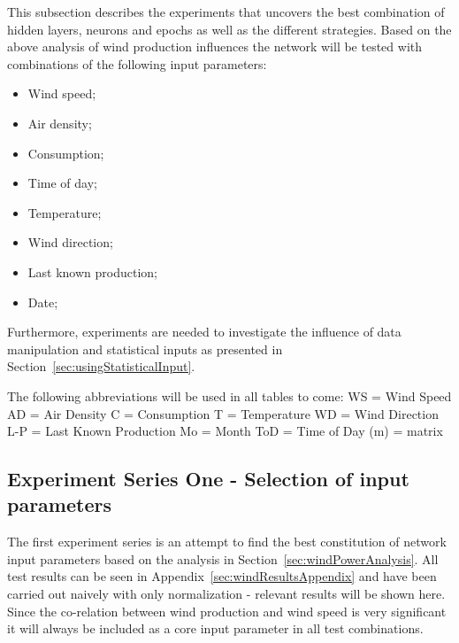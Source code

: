 This subsection describes the experiments that uncovers the best combination of hidden layers, neurons and epochs as well as the different strategies. Based on the above analysis of wind production influences the network will be tested with combinations of the following input parameters:

\begin{itemize}
\item Wind speed;
\item Air density;
\item Consumption;
\item Time of day;
\item Temperature;
\item Wind direction;
\item Last known production;
\item Date;
\end{itemize}

Furthermore, experiments are needed to investigate the influence of data manipulation and statistical inputs as presented in Section~\ref{sec:usingStatisticalInput}. 

The following abbreviations will be used in all tables to come:
WS = Wind Speed
AD = Air Density
C = Consumption
T = Temperature
WD = Wind Direction
L-P = Last Known Production
Mo = Month
ToD = Time of Day
(m) = matrix


\subsection{Experiment Series One - Selection of input parameters}
The first experiment series is an attempt to find the best constitution of network input parameters based on the analysis in Section~\ref{sec:windPowerAnalysis}. All test results can be seen in Appendix~\ref{sec:windResultsAppendix} and have been carried out naively with only normalization - relevant results will be shown here. Since the co-relation between wind production and wind speed is very significant it will always be included as a core input parameter in all test combinations.

